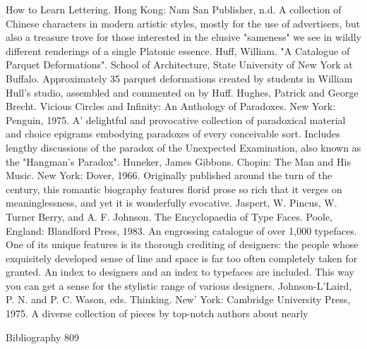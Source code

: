 How to Learn Lettering. Hong Kong: Nam San Publisher, n.d. A collection of Chinese
  characters in modern artistic styles, mostly for the use of advertisers, but also a treasure
  trove for those interested in the elusive "sameness" we see in wildly different renderings of
  a single Platonic essence.
Huff, William. "A Catalogue of Parquet Deformations". School of Architecture, State
  University of New York at Buffalo. Approximately 35 parquet deformations created by
  students in William Hull's studio, assembled and commented on by Huff.
Hughes, Patrick and George Brecht. Vicious Circles and Infinity: An Anthology of
  Paradoxes. New York: Penguin, 1975. A' delightful and provocative collection of
  paradoxical material and choice epigrams embodying paradoxes of every conceivable sort.
  Includes lengthy discussions of the paradox of the Unexpected Examination, also known as
  the "Hangman's Paradox".
Huneker, James Gibbons. Chopin: The Man and His Music. New York: Dover, 1966.
  Originally published around the turn of the century, this romantic biography features florid
  prose so rich that it verges on meaninglessness, and yet it is wonderfully evocative.
Jaspert, W. Pincus, W. Turner Berry, and A. F. Johnson. The Encyclopaedia of Type Faces.
  Poole, England: Blandford Press, 1983. An engrossing catalogue of over 1,000 typefaces.
  One of its unique features is its thorough crediting of designers: the people whose
  exquisitely developed sense of line and space is far too often completely taken for granted.
  An index to designers and an index to typefaces are included. This way you can get a sense
  for the stylistic range of various designers.
Johnson-L'Laird, P. N. and P. C. Wason, eds. Thinking. New' York: Cambridge University
  Press, 1975. A diverse collection of pieces by top-notch authors about nearly

Bibliography                                                                                809

